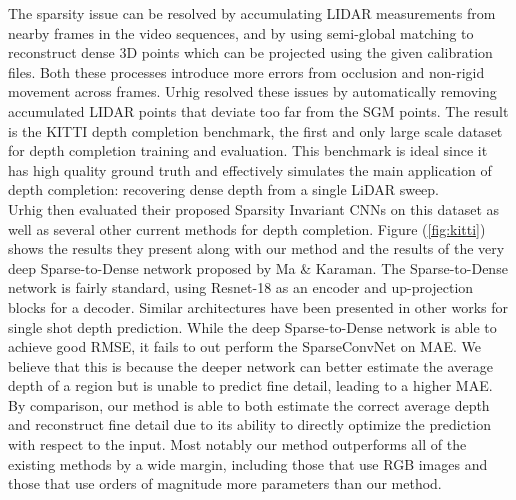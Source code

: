 The sparsity issue can be resolved by accumulating LIDAR measurements from nearby frames in the video sequences, and by using semi-global matching to reconstruct dense 3D points which can be projected using the given calibration files. Both these processes introduce more errors from occlusion and non-rigid movement across frames. Urhig \etal resolved these issues by automatically removing accumulated LIDAR points that deviate too far from the SGM points. The result is the KITTI depth completion benchmark, the first and only large scale dataset for depth completion training and evaluation. This benchmark is ideal since it has high quality ground truth and effectively simulates the main application of depth completion: recovering dense depth from a single LiDAR sweep.\\

Urhig \etal then evaluated their proposed Sparsity Invariant CNNs on this dataset as well as several other current methods for depth completion. Figure (\ref{fig:kitti}) shows the results they present along with our method and the results of the very deep Sparse-to-Dense network proposed by Ma \& Karaman. The Sparse-to-Dense network is fairly standard, using Resnet-18 as an encoder and up-projection blocks for a decoder. Similar architectures have been presented in other works for single shot depth prediction. While the deep Sparse-to-Dense network is able to achieve good RMSE, it fails to out perform the SparseConvNet on MAE. We believe that this is because the deeper network can better estimate the average depth of a region but is unable to predict fine detail, leading to a higher MAE. By comparison, our method is able to both estimate the correct average depth and reconstruct fine detail due to its ability to directly optimize the prediction with respect to the input. Most notably our method outperforms all of the existing methods by a wide margin, including those that use RGB images and those that use orders of magnitude more parameters than our method.
